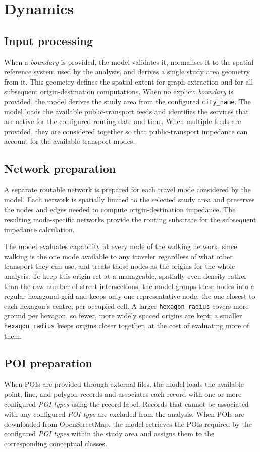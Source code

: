 \documentclass{article}
\begin{document}
\section{Dynamics}
\subsection{Input processing}
When a \emph{boundary} is provided, the model validates it, normalises it to the spatial reference system used by the analysis, and derives a single study area geometry from it. This geometry defines the spatial extent for graph extraction and for all subsequent origin-destination computations. When no explicit \emph{boundary} is provided, the model derives the study area from the configured \texttt{city\_name}. The model loads the available public-transport feeds and identifies the services that are active for the configured routing date and time. When multiple feeds are provided, they are considered together so that public-transport impedance can account for the available transport modes.

\subsection{Network preparation}
A separate routable network is prepared for each travel mode considered by the model. Each network is spatially limited to the selected study area and preserves the nodes and edges needed to compute origin-destination impedance. The resulting mode-specific networks provide the routing substrate for the subsequent impedance calculation.

The model evaluates capability at every node of the walking network, since walking is the one mode available to any traveler regardless of what other transport they can use, and treats those nodes as the origins for the whole analysis. To keep this origin set at a manageable, spatially even density rather than the raw number of street intersections, the model groups these nodes into a regular hexagonal grid and keeps only one representative node, the one closest to each hexagon's centre, per occupied cell. A larger \texttt{hexagon\_radius} covers more ground per hexagon, so fewer, more widely spaced origins are kept; a smaller \texttt{hexagon\_radius} keeps origins closer together, at the cost of evaluating more of them.

\subsection{POI preparation}
When POIs are provided through external files, the model loads the available point, line, and polygon records and associates each record with one or more configured \emph{POI types} using the record label. Records that cannot be associated with any configured \emph{POI type} are excluded from the analysis. When POIs are downloaded from OpenStreetMap, the model retrieves the POIs required by the configured \emph{POI types} within the study area and assigns them to the corresponding conceptual classes.
\end{document}
